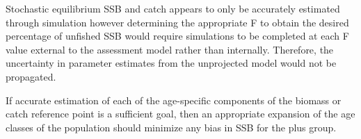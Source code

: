 \documentclass[
]{article}
\begin{document}
Stochastic equilibrium SSB and catch appears to only be accurately estimated through simulation however determining the appropriate F to obtain the desired percentage of unfished SSB would require simulations to be completed at each F value external to the assessment model rather than internally. Therefore, the uncertainty in parameter estimates from the unprojected model would not be propagated.

If accurate estimation of each of the age-specific components of the biomass or catch reference point is a sufficient goal, then an appropriate expansion of the age classes of the population should minimize any bias in SSB for the plus group.
\end{document}
